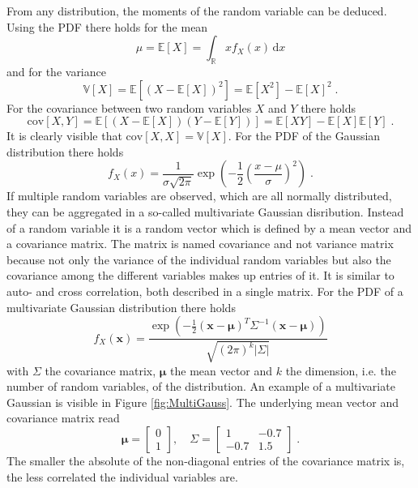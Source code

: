 \documentclass[%
  a4paper,oneside,%
  11pt,%
  smallchapters,
  green,%
  rgb, <cmyk>
  ]{tubsbook}
\begin{document}
From any distribution, the moments of the random variable can be deduced. Using the PDF there holds for the mean
\begin{equation}
\mu = \mathbb{E}[X] = \int_{\mathbb{R}} x f_X(x) \, \mathrm{d}x
\end{equation}
%
and for the variance
\begin{equation}
\mathbb{V}[X] = \mathbb{E}[(X-\mathbb{E}[X])^2] = \mathbb{E}[X^2] - \mathbb{E}[X]^2 \;.
\end{equation}
%
For the covariance between two random variables $X$ and $Y$ there holds
\begin{equation}
\mathrm{cov}[X,Y] = \mathbb{E}[(X-\mathbb{E}[X])(Y-\mathbb{E}[Y])] = \mathbb{E}[XY] - \mathbb{E}[X] \mathbb{E}[Y]\;.
\end{equation}
It is clearly visible that $\mathrm{cov}[X,X] = \mathbb{V}[X]$.
%
For the PDF of the Gaussian distribution there holds
\begin{equation}
f_X(x) = \frac{1}{\sigma \sqrt{2 \pi}} \exp(-\frac{1}{2} \left(\frac{x-\mu}{\sigma}\right)^2) \;.
\end{equation}
%
If multiple random variables are observed, which are all normally distributed, they can be aggregated in a so-called multivariate Gaussian disribution. Instead of a random variable it is a random vector which is defined by a mean vector and a covariance matrix. The matrix is named covariance and not variance matrix because not only the variance of the individual random variables but also the covariance among the different variables makes up entries of it. It is similar to auto- and cross correlation, both described in a single matrix.
For the PDF of a multivariate Gaussian distribution there holds
\begin{equation}
f_X(\bm{x}) = \frac{\exp(-\frac{1}{2}(\bm{x}-\bm{\mu})^T \Sigma^{-1}(\bm{x}-\bm{\mu}))}{\sqrt{(2\pi)^k \lvert \Sigma \rvert}}
\label{eqn:MultivariateGaussian}
\end{equation}
with $\Sigma$ the covariance matrix, $\bm{\mu}$ the mean vector and $k$ the dimension, i.e. the number of random variables, of the distribution.
An example of a multivariate Gaussian is visible in Figure \ref{fig:MultiGauss}. The underlying mean vector and covariance matrix read
\begin{equation}
\bm{\mu} = \begin{bmatrix}
           0 \\
           1
         \end{bmatrix}
, \quad     
\Sigma = \begin{bmatrix}
1 & -0.7 \\
-0.7 & 1.5 
\end{bmatrix} \;.
\end{equation}
The smaller the absolute of the non-diagonal entries of the covariance matrix is, the less correlated the individual variables are.
\end{document}
